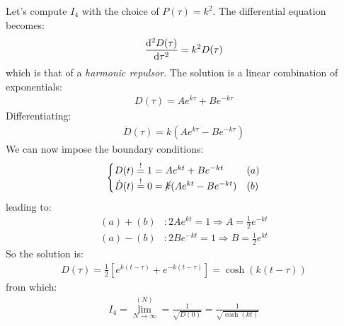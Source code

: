 \documentclass[../template.tex]{subfiles}
\begin{document}
\begin{example}[$P(\tau) = k^2$, free end-point]
    Let's compute $I_4$ with the choice of $P(\tau) = k^2$. The differential equation becomes:
    \begin{align*}
        \dv[2]{D(\tau)}{\tau} = k^2 D(\tau)
    \end{align*}  
    which is that of a \textit{harmonic repulsor}. The solution is a linear combination of exponentials:
    \begin{align}
        D(\tau) = A e^{k \tau} + Be^{-k \tau}
        \label{eqn:Dtau}
    \end{align} 
    Differentiating:
    \begin{align*}
        \dot{D}(\tau) = k(Ae^{k \tau} - B e^{-k \tau})
    \end{align*}
    We can now impose the boundary conditions:
    \begin{align*}
        \begin{cases}
            D(t) \overset{!}{=}  1 = A e^{kt} + Be^{-kt} & (a)\\
            \dot{D}(t) \overset{!}{=} 0 = \cancel{k}(A e^{kt} - Be^{-kt}) & (b)
        \end{cases}
    \end{align*}
    leading to:
    \begin{align*}
        (a) + (b)&\colon 2 A e^{kt} = 1 \Rightarrow A = \frac{1}{2} e^{-kt}\\
        (a) - (b)&\colon 2Be^{-kt} = 1 \Rightarrow B = \frac{1}{2}e^{kt}  
    \end{align*}
    So the solution is:
    \begin{align}
        D(\tau) = \frac{1}{2}\left[e^{k(t-\tau)} + e^{-k(t-\tau)}\right] = \cosh(k(t-\tau)) 
        \label{eqn:Dtau1}
    \end{align}
    from which:
    \begin{align*}
        I_4 = \lim_{N \to\infty }^{(N)} = \frac{1}{\sqrt{D(0)}} = \frac{1}{\sqrt{\cosh(kt)}}  
    \end{align*}
\end{example}
\end{document}
